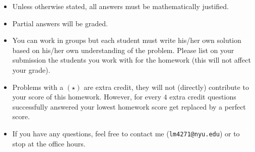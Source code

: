 \centerline{}
{\small
	\begin{itemize}
		\item Unless otherwise stated, all answers must be mathematically justified.
		\item Partial answers will be graded. 
		\item You can work in groups but each student must write his/her own solution based on his/her own understanding of the problem. Please list on your submission the students you work with for the homework (this will not affect your grade).
		\item Problems with a $(\star)$ are extra credit, they will not (directly) contribute to your score of this homework. However, for every $4$ extra credit questions successfully answered your lowest homework score get replaced by a perfect score.
		\item If you have any questions, feel free to contact me (\texttt{lm4271@nyu.edu}) or to stop at the office hours.
	\end{itemize}
}
\vspace{-0.4cm}
\centerline{}
\vspace{0.5cm}
